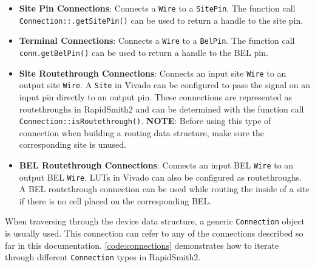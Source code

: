 \begin {itemize}
  
  \item \textbf{Site Pin Connections}: Connects a \texttt{Wire} to a
  \texttt{SitePin}. The function call \texttt{Connection::.get\-SitePin()} can
  be used to return a handle to the site pin.
  
  \item \textbf{Terminal Connections}: Connects a \texttt{Wire} to a \texttt{BelPin}. The
  function call \texttt{conn.get\-BelPin()} can be used to return a handle to
  the BEL pin.
  
  \item \textbf{Site Routethrough Connections}: Connects an input site \texttt{Wire}
  to an output site \texttt{Wire}. A \texttt{Site} in Vivado can be configured to pass
  the signal on an input pin directly to an output pin. These connections are
  represented as routethroughs in RapidSmith2 and can be determined with the
  function call \texttt{Connection::isRoutethr\-ough()}.
  \textbf{NOTE}: Before using this type of connection when building a
  routing data structure, make sure the corresponding site is unused.
  
  \item \textbf{BEL Routethrough Connections}: Connects an input BEL \texttt{Wire} to
  an output BEL \texttt{Wire}. LUTs in Vivado can also be configured as
  routethroughs. A BEL routethrough connection can be used while routing the
  inside of a site if there is no cell placed on the
  corresponding BEL.
\end{itemize}

\noindent
When traversing through the device data structure, a generic \texttt{Connection}
object is usually used. This connection can refer to any of the connections
described so far in this documentation. \autoref{code:connections} demonstrates
how to iterate through different \texttt{Connection} types in RapidSmith2.

